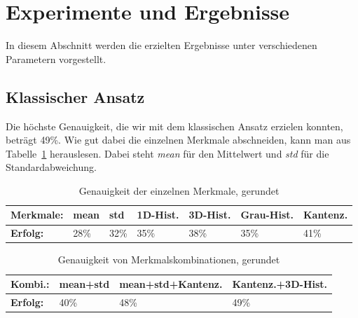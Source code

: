 \documentclass[a4,german]{article}
\begin{document}
\section{Experimente und Ergebnisse}
\label{sec:experimente}
In diesem Abschnitt werden die erzielten Ergebnisse unter verschiedenen Parametern vorgestellt.

\subsection{Klassischer Ansatz}%
Die höchste Genauigkeit, die wir mit dem klassischen Ansatz erzielen konnten, beträgt 49\%. Wie gut dabei die einzelnen Merkmale abschneiden, kann man aus Tabelle~\ref{tab:gen} herauslesen. Dabei steht \textit{mean} für den Mittelwert und \textit{std} für die Standardabweichung. 


\begin{table}[h]
\centering
\begin{tabular}{|l|l|l|l|l|l|l|}
 \hline
 \textbf{Merkmale:}&mean&std&1D-Hist.&3D-Hist.&Grau-Hist.&Kantenz.\\
 \hline
 \textbf{Erfolg:} & 28\% & 32\% & 35\% & 38\% & 35\% & 41\% \\
 \hline
\end{tabular}
\caption{Genauigkeit der einzelnen Merkmale, gerundet}
\label{tab:gen}
\end{table}

\begin{table}[h]
\centering
\begin{tabular}{|l|l|l|l|}
 \hline
 \textbf{Kombi.:}&mean+std&mean+std+Kantenz.&Kantenz.+3D-Hist.\\
 \hline
 \textbf{Erfolg:} & 40\% & 48\% & 49\% \\
 \hline
\end{tabular}
\caption{Genauigkeit von Merkmalskombinationen, gerundet}
\label{tab:gen2}
\end{table}
\end{document}
